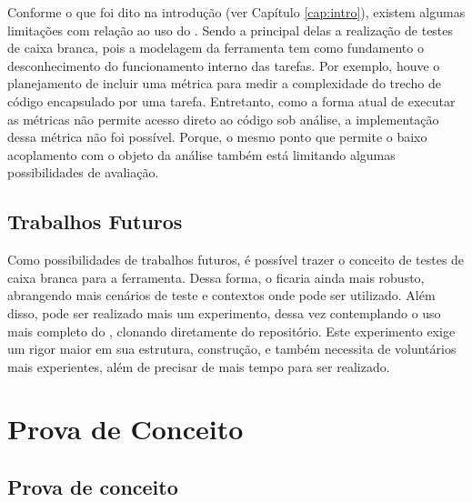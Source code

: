 \documentclass[12pt]{tcc}
\begin{document}
	Conforme o que foi dito na introdução (ver Capítulo \ref{cap:intro}), existem algumas limitações com relação ao uso do .
	Sendo a principal delas a realização de testes de caixa branca, pois a modelagem da ferramenta tem como fundamento o desconhecimento do funcionamento interno das tarefas.
	Por exemplo, houve o planejamento de incluir uma métrica para medir a complexidade do trecho de código encapsulado por uma tarefa.
	Entretanto, como a forma atual de executar as métricas não permite acesso direto ao código sob análise, a implementação dessa métrica não foi possível.
	Porque, o mesmo ponto que permite o baixo acoplamento com o objeto da análise também está limitando algumas possibilidades de avaliação.

	\section{Trabalhos Futuros}
	\label{section:trabalhos-futuros}

	Como possibilidades de trabalhos futuros, é possível trazer o conceito de testes de caixa branca para a ferramenta. Dessa forma, o  ficaria ainda mais robusto, abrangendo mais cenários de teste e contextos onde pode ser utilizado. Além disso, pode ser realizado mais um experimento, dessa vez contemplando o uso mais completo do , clonando diretamente do repositório. Este experimento exige um rigor maior em sua estrutura, construção, e também necessita de voluntários mais experientes, além de precisar de mais tempo para ser realizado.


	\label{bibpage}
	\renewcommand\bibname{Referências}
	
	
	\label{bibfinalpage}

	\label{lastpage}



	\appendix








\chapter{Prova de Conceito}
\label{apx:mock}

\section{Prova de conceito}
\label{cap:prova_de_conceito}
\end{document}
